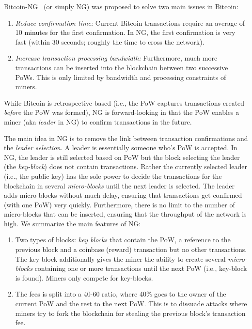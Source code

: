 \documentclass[]{report}   %
\begin{document}
Bitcoin-NG~\cite{eyal2016bitcoin} (or simply NG) was proposed to solve two main issues in Bitcoin:
\begin{enumerate}
	\item {\em Reduce confirmation time:} Current Bitcoin transactions require an average of 10 minutes for the first confirmation. In NG, the first confirmation is very fast (within 30 seconds; roughly the time to cross the network). 
	\item {\em Increase transaction processing bandwidth:} Furthermore, much more transactions can be inserted into the blockchain between two successive PoWs. This is only limited by bandwidth and processing constraints of miners.
\end{enumerate}

While Bitcoin is retrospective based (i.e., the PoW captures transactions created {\em before} the PoW was formed), NG is forward-looking in that the PoW enables a miner (aka {\em leader} in NG) to confirm transactions in the future. 

The main idea in NG is to remove the link between transaction confirmations and the {\em leader selection}. A leader is essentially someone who's PoW is accepted. In NG, the leader is still selected based on PoW but the block selecting the leader (the {\em key-block}) does not contain transactions. Rather the currently selected leader (i.e., the public key) has the sole power to decide the transactions for the blockchain in several {\em micro-blocks} until the next leader is selected. The leader adds micro-blocks without much delay, ensuring that transactions get confirmed (with one PoW) very quickly. Furthermore, there is no limit to the number of micro-blocks that can be inserted, ensuring that the throughput of the network is high.
We summarize the main features of NG:
\begin{enumerate}
	\item Two types of blocks: {\em key blocks} that contain the PoW, a reference to the previous block and a coinbase (reward) transaction but no other transactions. The key block additionally gives the miner the ability to create several {\em micro-blocks} containing one or more transactions until the next PoW (i.e., key-block is found). Miners only compete for key-blocks.
	\item The fees is split into a 40-60 ratio, where 40\% goes to the owner of the current PoW and the rest to the next PoW. This is to dissuade attacks where miners try to fork the blockchain for stealing the previous block's transaction fee.
\end{enumerate}
\end{document}
